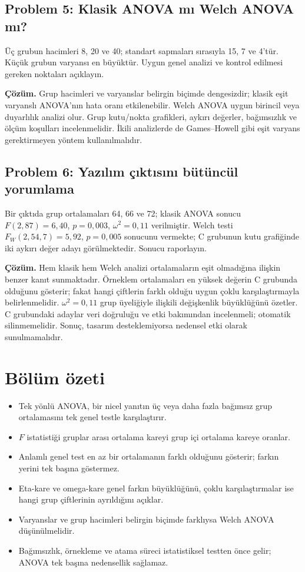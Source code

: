 \subsection*{Problem 5: Klasik ANOVA mı Welch ANOVA mı?}

Üç grubun hacimleri 8, 20 ve 40; standart sapmaları sırasıyla 15, 7 ve 4'tür.
Küçük grubun varyansı en büyüktür. Uygun genel analizi ve kontrol edilmesi
gereken noktaları açıklayın.

\textbf{Çözüm.} Grup hacimleri ve varyanslar belirgin biçimde dengesizdir;
klasik eşit varyanslı ANOVA'nın hata oranı etkilenebilir. Welch ANOVA uygun
birincil veya duyarlılık analizi olur. Grup kutu/nokta grafikleri, aykırı
değerler, bağımsızlık ve ölçüm koşulları incelenmelidir. İkili analizlerde de
Games--Howell gibi eşit varyans gerektirmeyen yöntem kullanılmalıdır.

\subsection*{Problem 6: Yazılım çıktısını bütüncül yorumlama}

Bir çıktıda grup ortalamaları 64, 66 ve 72; klasik ANOVA sonucu
$F(2,87)=6{,}40$, $p=0{,}003$, $\omega^2=0{,}11$ verilmiştir. Welch testi
$F_W(2,54{,}7)=5{,}92$, $p=0{,}005$ sonucunu vermekte; C grubunun kutu
grafiğinde iki aykırı değer adayı görülmektedir. Sonucu raporlayın.

\textbf{Çözüm.} Hem klasik hem Welch analizi ortalamaların eşit olmadığına
ilişkin benzer kanıt sunmaktadır. Örneklem ortalamaları en yüksek değerin C
grubunda olduğunu gösterir; fakat hangi çiftlerin farklı olduğu uygun çoklu
karşılaştırmayla belirlenmelidir. $\omega^2=0{,}11$ grup üyeliğiyle ilişkili
değişkenlik büyüklüğünü özetler. C grubundaki adaylar veri doğruluğu ve etki
bakımından incelenmeli; otomatik silinmemelidir. Sonuç, tasarım desteklemiyorsa
nedensel etki olarak sunulmamalıdır.



\section{Bölüm özeti}

\begin{itemize}
  \item Tek yönlü ANOVA, bir nicel yanıtın üç veya daha fazla bağımsız grup ortalamasını tek genel testle karşılaştırır.
  \item $F$ istatistiği gruplar arası ortalama kareyi grup içi ortalama kareye oranlar.
  \item Anlamlı genel test en az bir ortalamanın farklı olduğunu gösterir; farkın yerini tek başına göstermez.
  \item Eta-kare ve omega-kare genel farkın büyüklüğünü, çoklu karşılaştırmalar ise hangi grup çiftlerinin ayrıldığını açıklar.
  \item Varyanslar ve grup hacimleri belirgin biçimde farklıysa Welch ANOVA düşünülmelidir.
  \item Bağımsızlık, örnekleme ve atama süreci istatistiksel testten önce gelir; ANOVA tek başına nedensellik sağlamaz.
\end{itemize}

